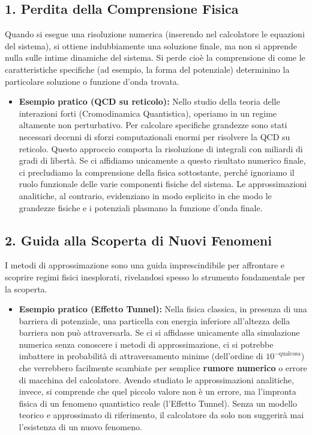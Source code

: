 \subsection{1. Perdita della Comprensione Fisica}
Quando si esegue una risoluzione numerica (inserendo nel calcolatore le equazioni del sistema), si ottiene indubbiamente una soluzione finale, ma non si apprende nulla sulle intime dinamiche del sistema. Si perde cioè la comprensione di come le caratteristiche specifiche (ad esempio, la forma del potenziale) determinino la particolare soluzione o funzione d'onda trovata.
\begin{itemize}
\item \textbf{Esempio pratico (QCD su reticolo):} Nello studio della teoria delle interazioni forti (Cromodinamica Quantistica), operiamo in un regime altamente non perturbativo. Per calcolare specifiche grandezze sono stati necessari decenni di sforzi computazionali enormi per risolvere la QCD su reticolo. Questo approccio comporta la risoluzione di integrali con miliardi di gradi di libertà. Se ci affidiamo unicamente a questo risultato numerico finale, ci precludiamo la comprensione della fisica sottostante, perché ignoriamo il ruolo funzionale delle varie componenti fisiche del sistema. Le approssimazioni analitiche, al contrario, evidenziano in modo esplicito in che modo le grandezze fisiche e i potenziali plasmano la funzione d'onda finale.
\end{itemize}

\subsection{2. Guida alla Scoperta di Nuovi Fenomeni}
I metodi di approssimazione sono una guida imprescindibile per affrontare e scoprire regimi fisici inesplorati, rivelandosi spesso lo strumento fondamentale per la scoperta.
\begin{itemize}
\item \textbf{Esempio pratico (Effetto Tunnel):} Nella fisica classica, in presenza di una barriera di potenziale, una particella con energia inferiore all'altezza della barriera non può attraversarla. Se ci si affidasse unicamente alla simulazione numerica senza conoscere i metodi di approssimazione, ci si potrebbe imbattere in probabilità di attraversamento minime (dell'ordine di $10^{-\text{qualcosa}}$) che verrebbero facilmente scambiate per semplice \textbf{rumore numerico} o errore di macchina del calcolatore. Avendo studiato le approssimazioni analitiche, invece, si comprende che quel piccolo valore non è un errore, ma l'impronta fisica di un fenomeno quantistico reale (l'Effetto Tunnel). Senza un modello teorico e approssimato di riferimento, il calcolatore da solo non suggerirà mai l'esistenza di un nuovo fenomeno.
\end{itemize}

